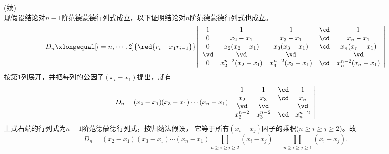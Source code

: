 \begin{frame}
  \begin{footnotesize}
    \proofname(续) \\[0.2cm]
    现假设结论对$n-1$阶范德蒙德行列式成立，以下证明结论对$n$阶范德蒙德行列式也成立。
    $$
    D_n \xlongequal[i=n,\cdots, 2]{\red{r_i - x_1 r_{i-1}}}\left|
    \begin{array}{ccccc}  
      1     & 1                    & 1                       & \cd   & 1    \\
      0     & x_2 - x_1            & x_3 - x_1               &  \cd  & x_n - x_1 \\
      0     & x_2(x_2 - x_1)       & x_3(x_3 - x_1)          &  \cd  & x_n(x_n - x_1)\\
      \vd   & \vd                  & \vd                     &      & \vd   \\
      0     & x_2^{n-2}(x_2-x_1)    & x_3^{n-2}(x_3 - x_1)    &  \cd  & x_n^{n-2}(x_n - x_1) 
    \end{array}\right|
    $$
    按第1列展开，并把每列的公因子$(x_i-x_1)$提出，就有
    $$
    D_n = (x_2-x_1)(x_3-x_1)\cdots(x_n-x_1)\left|
    \begin{array}{cccc}  
      1            & 1          &  \cd  & 1 \\
      x_2          & x_3         &  \cd  & x_n\\
      \vd          & \vd         &      & \vd   \\
      x_2^{n-2}     & x_3^{n-2}    &  \cd  & x_n^{n-2}
    \end{array}\right|
    $$
    上式右端的行列式为$n-1$阶范德蒙德行列式，按归纳法假设，
    它等于所有$(x_i-x_j)$因子的乘积($n\ge i \ge j \ge 2$)。故
    $$
    D_n = (x_2-x_1)(x_3-x_1)\cdots(x_n-x_1) \prod_{n\ge i \ge j \ge 2}(x_i - x_j)
    = \prod_{n\ge i \ge j \ge 1}(x_i - x_j).
    $$
  \end{footnotesize}
\end{frame}

